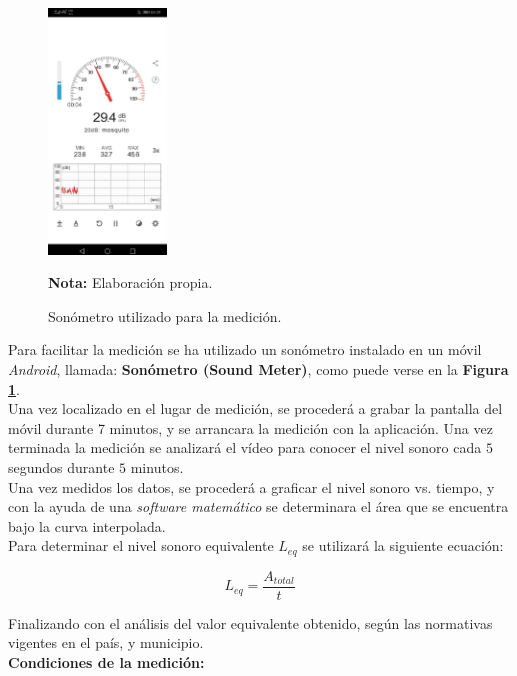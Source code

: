 \documentclass[letter,11pt]{article}
\newcommand{\source}[1]{\vspace{-11pt} \caption*{\small{\textbf{Nota:} {#1}}}}
\begin{document}
\begin{figure}
\centering
\includegraphics[width=0.28\textwidth]{resources/f4.eps}
\caption{Sonómetro utilizado para la medición.}
\label{figura4}
\source{Elaboración propia.}
\end{figure}

Para facilitar la medición se ha utilizado un sonómetro instalado en un móvil
\emph{Android}, llamada: \textbf{Sonómetro (Sound Meter)}, como puede verse en
la \textbf{Figura \ref{figura4}}.
\\

Una vez localizado en el lugar de medición, se procederá a grabar la pantalla
del móvil durante 7 minutos, y se arrancara la medición con la aplicación. Una
vez terminada la medición se analizará el vídeo para conocer el nivel sonoro
cada $5$ segundos durante $5$ minutos.
\\

Una vez medidos los datos, se procederá a graficar el nivel sonoro vs. tiempo, y
con la ayuda de una \emph{software matemático} se determinara el área que se
encuentra bajo la curva interpolada.
\\

Para determinar el nivel sonoro equivalente $L_{eq}$ se utilizará la siguiente
ecuación:

\begin{equation*}
    L_{eq} = \frac{A_{total}}{t}
\end{equation*}
\vspace{0.10cm}

Finalizando con el análisis del valor equivalente obtenido, según las normativas
vigentes en el país, y municipio.
\\

\textbf{Condiciones de la medición:} \\
\vspace{-0.4cm}
\end{document}
